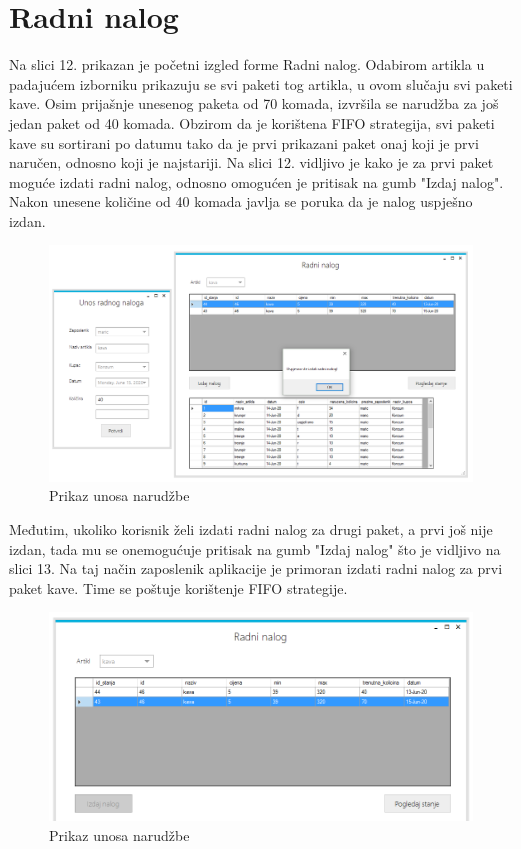 \documentclass{foi}
\begin{document}
\section{Radni nalog}
Na slici 12. prikazan je početni izgled forme Radni nalog. Odabirom artikla u padajućem izborniku prikazuju se svi paketi tog artikla, u ovom slučaju svi paketi kave. Osim prijašnje unesenog paketa od 70 komada, izvršila se narudžba za još jedan paket od 40 komada. Obzirom da je korištena FIFO strategija, svi paketi kave su sortirani po datumu tako da je prvi prikazani paket onaj koji je prvi naručen, odnosno koji je najstariji. Na slici 12. vidljivo je kako je za prvi paket moguće izdati radni nalog, odnosno omogućen je pritisak na gumb "Izdaj nalog". Nakon unesene količine od 40 komada javlja se poruka da je nalog uspješno izdan.
\newpage
\begin{figure}[h]
    \centering 
    \includegraphics[width=1.0\textwidth]{slike/unos radni nalog kave.PNG}
    \caption{Prikaz unosa narudžbe}
    \label{slika-12}
\end{figure}

Međutim, ukoliko korisnik želi izdati radni nalog za drugi paket, a prvi još nije izdan, tada mu se onemogućuje pritisak na gumb "Izdaj nalog" što je vidljivo na slici 13. Na taj način zaposlenik aplikacije je primoran izdati radni nalog za prvi paket kave. Time se poštuje korištenje FIFO strategije. 

\begin{figure}[h]
    \centering 
    \includegraphics[width=1.0\textwidth]{slike/drugi paket kave ne moze se naruciti.PNG}
    \caption{Prikaz unosa narudžbe}
    \label{slika-13}
\end{figure}
\end{document}
